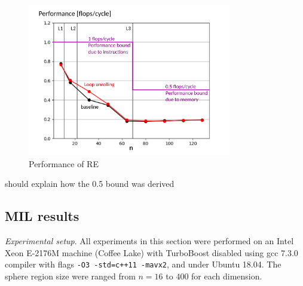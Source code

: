 \documentclass[letterpaper]{article}
\begin{document}
\begin{figure}[H]
  \centering
 
  \includegraphics[width=3.5in]{figs/plots/regions/regions_performance.pdf}
  \caption{Performance of RE}
  \label{res:regions}
\end{figure}
{\color{red} should explain how the 0.5 bound was derived}

\subsection{MIL results} 
\textit{Experimental setup}. 
All experiments in this section were performed on an Intel Xeon E-2176M machine (Coffee Lake) with TurboBoost disabled using gcc 7.3.0 compiler with flags \texttt{-O3 -std=c++11 -mavx2}, and under Ubuntu 18.04. The sphere region size were ranged from $n=16$ to $400$ for each dimension.
\end{document}
